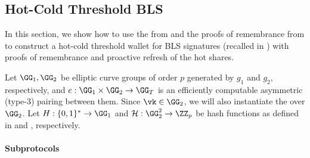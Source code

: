 \subsection{Hot-Cold Threshold BLS}\label{sec:bls-construction}

% 
In this section, we show how to use the \mex from  and the proofs of remembrance from  to construct a hot-cold threshold wallet for BLS signatures (recalled in ) with proofs of remembrance and proactive refresh of the hot shares. 

Let $\GG_1, \GG_2$ be elliptic curve groups of order $p$ generated by $g_1$ and $g_2$, respectively, and $e: \GG_1 \times \GG_2 \rightarrow \GG_T$ is an efficiently computable asymmetric (type-3) pairing between them. 
Since $\vk \in \GG_2$, we will also instantiate the \mex over $\GG_2$. 
Let $\blshash: \{0, 1\}^* \rightarrow \GG_1$ and $\lhlhash: \GG_2^2 \rightarrow \ZZ_p$ be hash functions as defined in  and , respectively.

\paragraph{Subprotocols}




